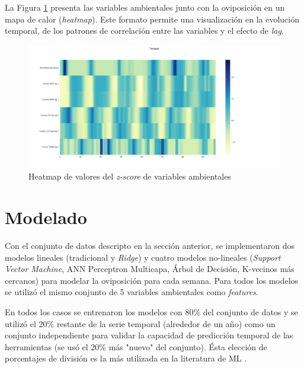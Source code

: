   \par La Figura \ref{fig:heatmap} presenta las variables ambientales junto
    con la oviposición en un mapa de calor (\textit{heatmap}). Este formato
    permite una visualización en la evolución temporal, de los
    patrones de correlación entre las variables y el efecto de \textit{lag}.

    \begin{figure}[hbt]
    \centering%
    \includegraphics[width=1\textwidth]{images/heatmap}%
    \caption{Heatmap de valores del \textit{z-score} de variables ambientales}\label{fig:heatmap}
    \end{figure}



\section{Modelado}

  \par Con el conjunto de datos descripto en la sección anterior, se implementaron
    dos modelos lineales (tradicional y \textit{Ridge}) y cuatro modelos
    no-lineales (\textit{Support Vector Machine}, ANN Perceptron Multicapa,
    Árbol de Decisión, K-vecinos más cercanos) para modelar la oviposición
    para cada semana. Para todos los modelos se utilizó el mismo conjunto de
    5 variables ambientales como \textit{features}.

  \par En todos los casos se entrenaron los modelos con 80\% del conjunto de
    datos y se utilizó el 20\% restante de la serie temporal (alrededor de un año)
    como un conjunto independiente para validar la capacidad de predicción temporal
    de las herramientas (se usó el 20\% más "nuevo" del conjunto). Ésta elección
    de porcentajes de división es la más utilizada en la literatura de ML \cite{ml_rainfall}.

